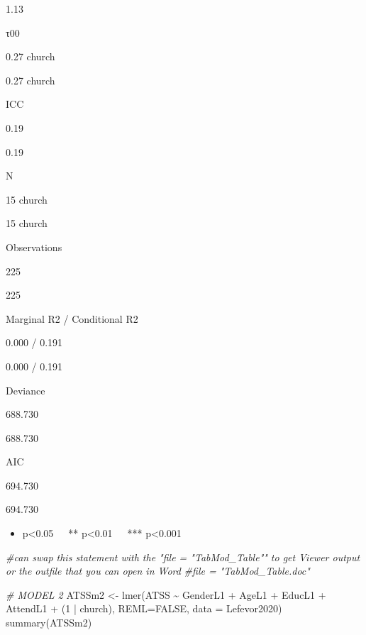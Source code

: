 \documentclass[
  english,
]{book}
\newenvironment{Shaded}{\begin{snugshade}}{\end{snugshade}}
\newcommand{\AttributeTok}[1]{\textcolor[rgb]{0.77,0.63,0.00}{#1}}
\newcommand{\CommentTok}[1]{\textcolor[rgb]{0.56,0.35,0.01}{\textit{#1}}}
\newcommand{\ConstantTok}[1]{\textcolor[rgb]{0.00,0.00,0.00}{#1}}
\newcommand{\DecValTok}[1]{\textcolor[rgb]{0.00,0.00,0.81}{#1}}
\newcommand{\FunctionTok}[1]{\textcolor[rgb]{0.00,0.00,0.00}{#1}}
\newcommand{\NormalTok}[1]{#1}
\newcommand{\OtherTok}[1]{\textcolor[rgb]{0.56,0.35,0.01}{#1}}
\newcommand{\SpecialCharTok}[1]{\textcolor[rgb]{0.00,0.00,0.00}{#1}}
\providecommand{\tightlist}{%
  \setlength{\itemsep}{0pt}\setlength{\parskip}{0pt}}
\begin{document}
1.13

τ00

0.27 church

0.27 church

ICC

0.19

0.19

N

15 church

15 church

Observations

225

225

Marginal R2 / Conditional R2

0.000 / 0.191

0.000 / 0.191

Deviance

688.730

688.730

AIC

694.730

694.730

\begin{itemize}
\tightlist
\item
  p\textless0.05~~~** p\textless0.01~~~*** p\textless0.001
\end{itemize}

\begin{Shaded}
\begin{Highlighting}[]
\CommentTok{\#can swap this statement with the "file = "TabMod\_Table"" to get Viewer output or the outfile that you can open in Word}
\CommentTok{\#file = "TabMod\_Table.doc"}
\end{Highlighting}
\end{Shaded}

\begin{Shaded}
\begin{Highlighting}[]
\CommentTok{\# MODEL 2}
\NormalTok{ATSSm2 }\OtherTok{\textless{}{-}} \FunctionTok{lmer}\NormalTok{(ATSS }\SpecialCharTok{\textasciitilde{}}\NormalTok{ GenderL1 }\SpecialCharTok{+}\NormalTok{ AgeL1 }\SpecialCharTok{+}\NormalTok{ EducL1 }\SpecialCharTok{+}\NormalTok{ AttendL1 }\SpecialCharTok{+}\NormalTok{ (}\DecValTok{1} \SpecialCharTok{|}\NormalTok{ church), }\AttributeTok{REML=}\ConstantTok{FALSE}\NormalTok{, }\AttributeTok{data =}\NormalTok{ Lefevor2020)}
\FunctionTok{summary}\NormalTok{(ATSSm2)}
\end{Highlighting}
\end{Shaded}
\end{document}
